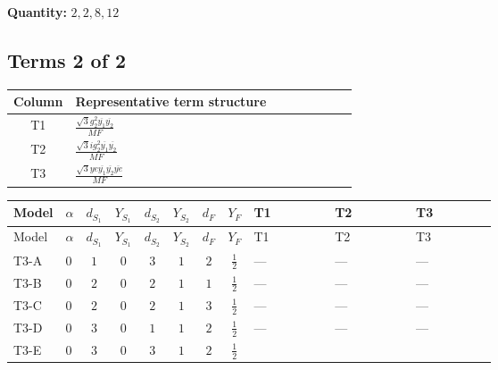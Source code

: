 \documentclass[8pt]{article}
\begin{document}
\begin{landscape}
\begin{longtable}{@{}llcccccc >{\raggedright\arraybackslash}p{0.21\linewidth} >{\raggedright\arraybackslash}p{0.21\linewidth} >{\raggedright\arraybackslash}p{0.21\linewidth}@{}}
\midrule
\bottomrule
\end{longtable}
\clearpage
\noindent\textbf{Quantity: }$\mathrm{2,2,8,12}$\par\smallskip
\subsection*{Terms 2 of 2}
\begin{center}
\begin{tabular}{@{}c >{\raggedright\arraybackslash}p{0.82\linewidth}@{}}
\toprule
Column & Representative term structure \\
\midrule
T1 & \(\displaystyle \frac{\sqrt{3} g_{2}^{2} \overline{y_{1}} \overline{y_{2}}}{MF}\) \\
\midrule
T2 & \(\displaystyle \frac{\sqrt{3} i g_{2}^{2} \overline{y_{1}} \overline{y_{2}}}{MF}\) \\
\midrule
T3 & \(\displaystyle \frac{\sqrt{3} ye \overline{y_{1}} \overline{y_{2}} \overline{ye}}{MF}\) \\
\midrule
\bottomrule
\end{tabular}
\end{center}
\smallskip
\tiny
\begin{longtable}{@{}llcccccc >{\raggedright\arraybackslash}p{0.21\linewidth} >{\raggedright\arraybackslash}p{0.21\linewidth} >{\raggedright\arraybackslash}p{0.21\linewidth}@{}}
\toprule
Model & $\alpha$ & $d_{S_1}$ & $Y_{S_1}$ & $d_{S_2}$ & $Y_{S_2}$ & $d_F$ & $Y_F$ & T1 & T2 & T3 \\
\midrule
\endfirsthead
\toprule
Model & $\alpha$ & $d_{S_1}$ & $Y_{S_1}$ & $d_{S_2}$ & $Y_{S_2}$ & $d_F$ & $Y_F$ & T1 & T2 & T3 \\
\midrule
\endhead
T3-A & $0$ & $1$ & $0$ & $3$ & $1$ & $2$ & $\frac{1}{2}$ & --- & --- & --- \\
\midrule
T3-B & $0$ & $2$ & $0$ & $2$ & $1$ & $1$ & $\frac{1}{2}$ & --- & --- & --- \\
\midrule
T3-C & $0$ & $2$ & $0$ & $2$ & $1$ & $3$ & $\frac{1}{2}$ & --- & --- & --- \\
\midrule
T3-D & $0$ & $3$ & $0$ & $1$ & $1$ & $2$ & $\frac{1}{2}$ & --- & --- & --- \\
\midrule
T3-E & $0$ & $3$ & $0$ & $3$ & $1$ & $2$ & $\frac{1}{2}$ & \scriptsize\adjustbox{max width=\linewidth}{$\begin{gathered} \frac{11 \sqrt{3} g_{2}^{2} \overline{y_{1}} \overline{y_{2}}}{8 MF}\end{gathered}$} & \scriptsize\adjustbox{max width=\linewidth}{$\begin{gathered} - \frac{\sqrt{3} i g_{2}^{2} \overline{y_{1}} \overline{y_{2}}}{6 MF}\end{gathered}$} & \scriptsize\adjustbox{max width=\linewidth}{$\begin{gathered} - \frac{\sqrt{3} ye \overline{y_{1}} \overline{y_{2}} \overline{ye}}{12 MF}\end{gathered}$} \\
\midrule
\bottomrule
\end{longtable}
\clearpage

\end{landscape}
\end{document}
